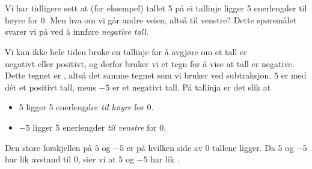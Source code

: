 





\section{\negintro}
Vi har tidligere sett at (for eksempel) tallet 5 på ei tallinje ligger 5 enerlengder til høyre for 0. 
Men hva om vi går andre veien, altså til venstre? Dette spørsmålet svarer vi på ved å innføre \textit{negative tall}. \regv

\vsk 
Vi kan ikke hele tiden bruke en tallinje for å avgjøre om et tall er\\ negativt eller positivt, og derfor bruker vi et tegn for å vise at tall er negative. Dette tegnet er \sym{$ - $}, altså det samme tegnet som vi bruker ved subtraksjon. $ 5 $ er med dét et positivt tall, mens $ -5 $ er et negativt tall. På tallinja er det slik at
\begin{itemize}
	\item 5 ligger 5 enerlengder \textsl{til høyre} for 0.
	\item $ -5 $ ligger 5 enerlengder \textsl{til venstre} for 0.
\end{itemize}
Den store forskjellen på $ 5 $ og $ -5 $ er på hvilken side av 0 tallene ligger. Da $ 5 $ og $ -5 $ har lik avstand til 0, sier vi at $ 5 $ og $ -5 $ har lik . \regv

\eks[1]{ \vs
\[ |27|=27 \]
}
\eks[2]{ \vs
\[\left|-27\right|=27 \]
}
\vsk
{}
\newpage
